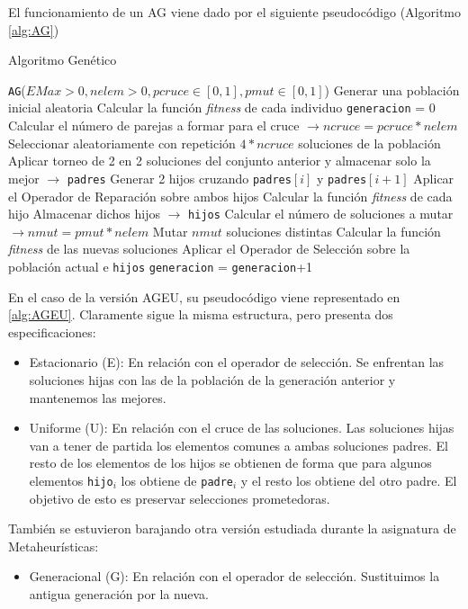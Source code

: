 El funcionamiento de un AG viene dado por el siguiente pseudocódigo (Algoritmo \ref{alg:AG})

\begin{algorithm}
\caption{Algoritmo Genético}\label{alg:AG}
\begin{algorithmic}[1]
\Procedure \texttt{AG}($EMax > 0, nelem > 0, pcruce \in [0,1], pmut \in [0,1]$)
\State Generar una población inicial aleatoria
\State Calcular la función \textit{fitness} de cada individuo
\State \texttt{generacion} = 0
	\State Calcular el número de parejas a formar para el cruce $\xrightarrow{}{} ncruce = pcruce*nelem$
	\State Seleccionar aleatoriamente con repetición $4*ncruce$ soluciones de la población
	\State Aplicar torneo de 2 en 2 soluciones del conjunto anterior y almacenar solo la mejor $\xrightarrow{}{}$ \texttt{padres}
		\State Generar 2 hijos cruzando \texttt{padres}$[i]$ y \texttt{padres}$[i+1]$
		\State Aplicar el Operador de Reparación sobre ambos hijos
		\State Calcular la función \textit{fitness} de cada hijo
		\State Almacenar dichos hijos $\xrightarrow{}{}$ \texttt{hijos}
	\EndFor	
	\State Calcular el número de soluciones a mutar $\xrightarrow{}{} nmut = pmut*nelem$
	\State Mutar $nmut$ soluciones distintas
	\State Calcular la función \textit{fitness} de las nuevas soluciones
	\State Aplicar el Operador de Selección sobre la población actual e \texttt{hijos}
	\State \texttt{generacion} = \texttt{generacion}+1
\EndWhile
\EndProcedure
\end{algorithmic}
\end{algorithm}

En el caso de la versión AGEU, su pseudocódigo viene representado en \ref{alg:AGEU}. 
Claramente sigue la misma estructura, pero presenta dos especificaciones:
\begin{itemize}
	\item Estacionario (E): En relación con el operador de selección. 
Se enfrentan las soluciones hijas con las de la población de la generación anterior y mantenemos las mejores. 
	\item Uniforme (U): En relación con el cruce de las soluciones. 
Las soluciones hijas van a tener de partida los elementos comunes a ambas soluciones padres. 
El resto de los elementos de los hijos se obtienen de forma que para algunos elementos \texttt{hijo$_i$} los obtiene de \texttt{padre$_i$} y el resto los obtiene del otro padre. 
El objetivo de esto es preservar selecciones prometedoras.	
\end{itemize}
También se estuvieron barajando otra versión estudiada durante la asignatura de Metaheurísticas:
\begin{itemize}
	\item Generacional (G): En relación con el operador de selección. 
Sustituimos la antigua generación por la nueva. 
\end{itemize}

